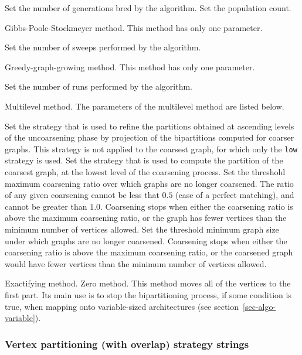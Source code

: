 \begin{itemize}
\begin{itemize}
\iteme[{\tt pass=}{\it nbr}]
Set the number of generations bred by the algorithm.
\iteme[{\tt pop=}{\it nbr}]
Set the population count.
\end{itemize}
\iteme[{\tt g}]
Gibbs-Poole-Stockmeyer method. This method has only one parameter.
\begin{itemize}
\iteme[{\tt pass=}{\it nbr}]
Set the number of sweeps performed by the algorithm.
\end{itemize}
\iteme[{\tt h}]
Greedy-graph-growing method. This method has only one parameter.
\begin{itemize}
\iteme[{\tt pass=}{\it nbr}]
Set the number of runs performed by the algorithm.
\end{itemize}
\iteme[{\tt m}]
Multilevel method. The parameters of the multilevel method are listed below.
\begin{itemize}
\iteme[{\tt asc=}{\it strat}]
Set the strategy that is used to refine the partitions obtained
at ascending levels of the uncoarsening phase by projection of the
bipartitions computed for coarser graphs.
This strategy is not applied to the coarsest graph, for which only the
{\tt low} strategy is used.
\iteme[{\tt low=}{\it strat}]
Set the strategy that is used to compute the partition of the
coarsest graph, at the lowest level of the coarsening process.
\iteme[{\tt rat=}{\it rat}]
Set the threshold maximum coarsening ratio over which graphs are no longer
coarsened. The ratio of any given coarsening cannot be less that $0.5$
(case of a perfect matching), and cannot be greater than $1.0$.
Coarsening stops when either the coarsening ratio is above the maximum
coarsening ratio, or the graph has fewer vertices than the minimum number of
vertices allowed.
\iteme[{\tt vert=}{\it nbr}]
Set the threshold minimum graph size under which graphs are no longer
coarsened. Coarsening stops when either the coarsening ratio is above the
maximum coarsening ratio, or the coarsened graph would have fewer
vertices than the minimum number of vertices allowed.
\end{itemize}
\iteme[{\tt x}]
Exactifying method.
\iteme[{\tt z}]
Zero method. This method moves all of the vertices to the first
part. Its main use is to stop the bipartitioning process, if some
condition is true, when mapping onto variable-sized architectures (see
section~\ref{sec-algo-variable}).
\end{itemize}

\subsubsection{Vertex partitioning (with overlap) strategy strings}
\label{sec-lib-format-strat-part-ovl}

